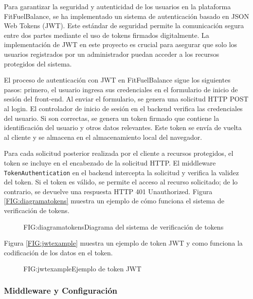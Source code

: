 Para garantizar la seguridad y autenticidad de los usuarios en la plataforma FitFuelBalance, se ha implementado un sistema de autenticación basado en JSON Web Tokens (JWT). Este estándar de seguridad permite la comunicación segura entre dos partes mediante el uso de tokens firmados digitalmente. La implementación de JWT en este proyecto es crucial para asegurar que solo los usuarios registrados por un administrador puedan acceder a los recursos protegidos del sistema\cite{JWTIntroduction}.

El proceso de autenticación con JWT en FitFuelBalance sigue los siguientes pasos: primero, el usuario ingresa sus credenciales en el formulario de inicio de sesión del front-end. Al enviar el formulario, se genera una solicitud HTTP POST al login. El controlador de inicio de sesión en el backend verifica las credenciales del usuario. Si son correctas, se genera un token firmado que contiene la identificación del usuario y otros datos relevantes. Este token se envía de vuelta al cliente y se almacena en el almacenamiento local del navegador.

Para cada solicitud posterior realizada por el cliente a recursos protegidos, el token se incluye en el encabezado de la solicitud HTTP. El middleware \texttt{TokenAuthentication} en el backend intercepta la solicitud y verifica la validez del token. Si el token es válido, se permite el acceso al recurso solicitado; de lo contrario, se devuelve una respuesta HTTP 401 Unauthorized. Figura \ref{FIG:diagramatokens} muestra un ejemplo de cómo funciona el sistema de verificación de tokens.

\begin{figure}[Diagrama Tokens]{FIG:diagramatokens}{Diagrama del sistema de verificación de tokens \cite{JWTIntroduction}}
\end{figure}

Figura \ref{FIG:jwtexample} muestra un ejemplo de token JWT y como funciona la codificación de los datos en el token.

\begin{figure}[Ejemplo Token]{FIG:jwtexample}{Ejemplo de token JWT \cite{JWTIntroduction}}
\end{figure}

\subsubsection{Middleware y Configuración}

